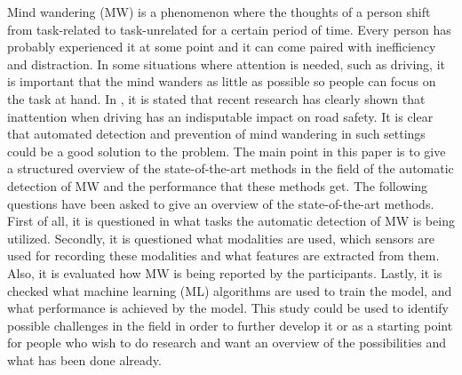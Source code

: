 Mind wandering (MW) is a phenomenon where the thoughts of a person shift from task-related to task-unrelated for a certain period of time. Every person has probably experienced it at some point and it can come paired with inefficiency and distraction. In some situations where attention is needed, such as driving, it is important that the mind wanders as little as possible so people can focus on the task at hand. In \cite{berthie2015restless}, it is stated that recent research has clearly shown that inattention when driving has an indisputable impact on road safety. It is clear that automated detection and prevention of mind wandering in such settings could be a good solution to the problem. The main point in this paper is to give a structured overview of the state-of-the-art methods in the field of the automatic detection of MW and the performance that these methods get. The following questions have been asked to give an overview of the state-of-the-art methods. First of all, it is questioned in what tasks the automatic detection of MW is being utilized. Secondly, it is questioned what modalities are used, which sensors are used for recording these modalities and what features are extracted from them. Also, it is evaluated how MW is being reported by the participants. Lastly, it is checked what machine learning (ML) algorithms are used to train the model, and what performance is achieved by the model. This study could be used to identify possible challenges in the field in order to further develop it or as a starting point for people who wish to do research  and want an overview of the possibilities and what has been done already.